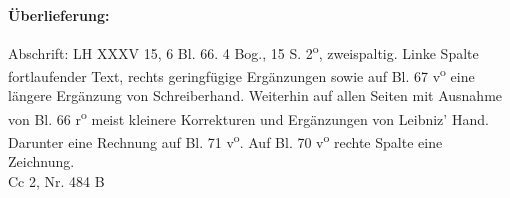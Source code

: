       
               
                \begin{ledgroupsized}[r]{120mm}
                \footnotesize 
                \pstart                
                \noindent\textbf{\"{U}berlieferung:}   
                \pend
                \end{ledgroupsized}
            
              
                            \begin{ledgroupsized}[r]{114mm}
                            \footnotesize 
                            \pstart \parindent -6mm
                            Abschrift: LH XXXV 15, 6 Bl. 66. 4 Bog., 15 S. 2\textsuperscript{o}, zweispaltig. Linke Spalte fortlaufender Text, rechts geringf\"{u}gige Erg\"{a}nzungen sowie auf Bl. 67 v\textsuperscript{o} eine l\"{a}ngere Erg\"{a}nzung von Schreiberhand. Weiterhin auf allen Seiten mit Ausnahme von Bl. 66 r\textsuperscript{o} meist kleinere Korrekturen und Erg\"{a}nzungen von Leibniz' Hand. Darunter eine Rechnung auf Bl. 71 v\textsuperscript{o}. Auf Bl. 70 v\textsuperscript{o} rechte Spalte eine Zeichnung.\\Cc 2, Nr. 484 B \pend
                            \end{ledgroupsized}
                \vspace*{8mm}
                \pstart 
                \normalsize
